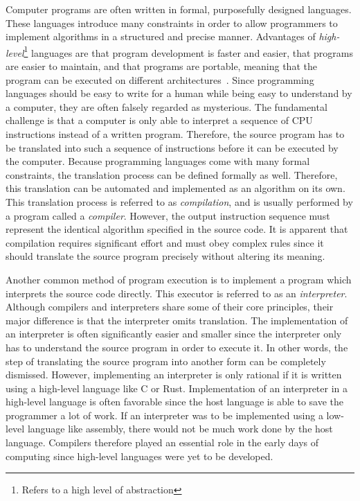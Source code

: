 Computer programs are often written in formal, purposefully designed languages.
These languages introduce many constraints in order to allow
programmers to implement algorithms in a structured and precise manner.
Advantages of \emph{high-level}\footnote{Refers to a high level of abstraction} languages
are that program development is faster and easier, that programs are easier to maintain, and that programs are portable,
meaning that the program can be executed on different architectures~\cite[p.~9]{Dandamudi2005Risc}.
Since programming languages should be easy to write for a human while being easy to understand by a computer,
they are often falsely regarded as mysterious.
The fundamental challenge is that a computer is only able to interpret a sequence of CPU instructions instead of a written program.
Therefore, the source program has to be translated into such a sequence of instructions before it can be executed by the computer.
Because programming languages come with many formal constraints, the translation process can be defined formally as well.
Therefore, this translation can be automated and implemented as an algorithm on its own.
This translation process is referred to as \emph{compilation}, and is usually performed by a program called a \emph{compiler}.
However, the output instruction sequence must represent the identical algorithm specified in the source code.
It is apparent that compilation requires significant effort and must obey complex rules
since it should translate the source program precisely without altering its meaning.

Another common method of program execution is to implement a program which interprets the source code directly.
This executor is referred to as an \emph{interpreter}.
Although compilers and interpreters share some of their core principles, their major difference is that the interpreter omits translation.
The implementation of an interpreter is often significantly easier and smaller since the interpreter only has to understand the source program in order to execute it.
In other words, the step of translating the source program into another form can be completely dismissed.
However, implementing an interpreter is only rational if it is written using a high-level language like C or Rust.
Implementation of an interpreter in a high-level language is often favorable since the host language is able to save the programmer a lot of work.
If an interpreter was to be implemented using a low-level language like assembly, there would not be much work done by the host language.
Compilers therefore played an essential role in the early days of computing since high-level languages were yet to be developed.

